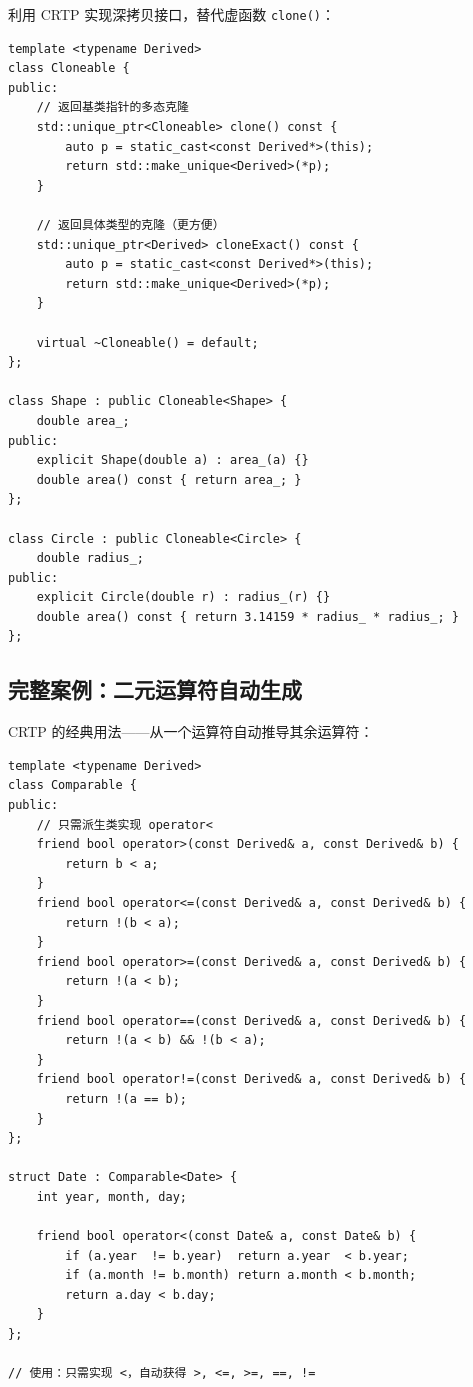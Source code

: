 \documentclass[12pt,a4paper,fontset=fandol]{ctexbook}
\begin{document}
利用 CRTP 实现深拷贝接口，替代虚函数 \texttt{clone()}：

\begin{lstlisting}[caption={CRTP 可克隆混入}]
template <typename Derived>
class Cloneable {
public:
    // 返回基类指针的多态克隆
    std::unique_ptr<Cloneable> clone() const {
        auto p = static_cast<const Derived*>(this);
        return std::make_unique<Derived>(*p);
    }

    // 返回具体类型的克隆（更方便）
    std::unique_ptr<Derived> cloneExact() const {
        auto p = static_cast<const Derived*>(this);
        return std::make_unique<Derived>(*p);
    }

    virtual ~Cloneable() = default;
};

class Shape : public Cloneable<Shape> {
    double area_;
public:
    explicit Shape(double a) : area_(a) {}
    double area() const { return area_; }
};

class Circle : public Cloneable<Circle> {
    double radius_;
public:
    explicit Circle(double r) : radius_(r) {}
    double area() const { return 3.14159 * radius_ * radius_; }
};
\end{lstlisting}

\subsection{完整案例：二元运算符自动生成}

CRTP 的经典用法——从一个运算符自动推导其余运算符：

\begin{lstlisting}[caption={CRTP 运算符混入}]
template <typename Derived>
class Comparable {
public:
    // 只需派生类实现 operator<
    friend bool operator>(const Derived& a, const Derived& b) {
        return b < a;
    }
    friend bool operator<=(const Derived& a, const Derived& b) {
        return !(b < a);
    }
    friend bool operator>=(const Derived& a, const Derived& b) {
        return !(a < b);
    }
    friend bool operator==(const Derived& a, const Derived& b) {
        return !(a < b) && !(b < a);
    }
    friend bool operator!=(const Derived& a, const Derived& b) {
        return !(a == b);
    }
};

struct Date : Comparable<Date> {
    int year, month, day;

    friend bool operator<(const Date& a, const Date& b) {
        if (a.year  != b.year)  return a.year  < b.year;
        if (a.month != b.month) return a.month < b.month;
        return a.day < b.day;
    }
};

// 使用：只需实现 <，自动获得 >, <=, >=, ==, !=
\end{lstlisting}
\end{document}
